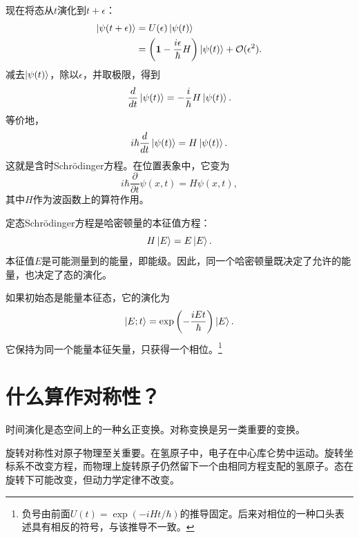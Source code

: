 现在将态从\(t\)演化到\(t+\epsilon\)：
\begin{align}
\left\lvert\psi(t+\epsilon)\right\rangle
&=
U(\epsilon)\left\lvert\psi(t)\right\rangle
\\
&=
\left(
\mathbf 1-\frac{i\epsilon}{\hbar}H
\right)\left\lvert\psi(t)\right\rangle
+\mathcal O(\epsilon^2).
\end{align}
减去\(\left\lvert\psi(t)\right\rangle\)，除以\(\epsilon\)，并取极限，得到
\begin{equation}
\frac{d}{dt}\left\lvert\psi(t)\right\rangle
=
-\frac{i}{\hbar}H\left\lvert\psi(t)\right\rangle.
\end{equation}
等价地，
\begin{equation}
i\hbar\frac{d}{dt}\left\lvert\psi(t)\right\rangle
=
H\left\lvert\psi(t)\right\rangle.
\end{equation}
这就是含时Schr\"odinger方程。在位置表象中，它变为
\begin{equation}
i\hbar\frac{\partial}{\partial t}\psi(x,t)
=
H\psi(x,t),
\end{equation}
其中\(H\)作为波函数上的算符作用。

定态Schr\"odinger方程是哈密顿量的本征值方程：
\begin{equation}
H\left\lvert E\right\rangle=E\left\lvert E\right\rangle.
\end{equation}
本征值\(E\)是可能测量到的能量，即能级。因此，同一个哈密顿量既决定了允许的能量，也决定了态的演化。

如果初始态是能量本征态，它的演化为
\begin{equation}
\left\lvert E;t\right\rangle
=
\exp\left(-\frac{iEt}{\hbar}\right)\left\lvert E\right\rangle.
\end{equation}
它保持为同一个能量本征矢量，只获得一个相位。\footnote{负号由前面\(U(t)=\exp(-iHt/\hbar)\)的推导固定。后来对相位的一种口头表述具有相反的符号，与该推导不一致。}

\begin{classroomqa}
\end{classroomqa}

\section{什么算作对称性？}

时间演化是态空间上的一种幺正变换。对称变换是另一类重要的变换。

旋转对称性对原子物理至关重要。在氢原子中，电子在中心库仑势中运动。旋转坐标系不改变方程，而物理上旋转原子仍然留下一个由相同方程支配的氢原子。态在旋转下可能改变，但动力学定律不改变。

